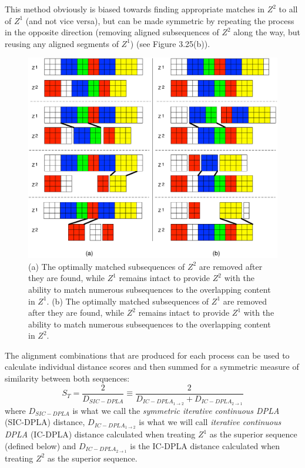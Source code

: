 \documentclass[12pt]{report} 	%
\numberwithin{figure}{chapter}
\numberwithin{table}{chapter}
\numberwithin{equation}{chapter}
\begin{document}
\begin{flushleft}
This method obviously is biased towards finding appropriate matches in $Z^2$ to all of $Z^1$ (and not vice versa), but can be made symmetric by repeating the process in the opposite direction (removing aligned subsequences of $Z^2$ along the way, but reusing any aligned segments of $Z^1$) (see Figure 3.25(b)). 
\begin{figure}[h!]
\begin{center}
\includegraphics[width=\linewidth]{GreedyMatching4}
\caption[Asymmetric greedy removal after matching in both directions]{(a) The optimally matched subsequences of $Z^2$ are removed after they are found, while $Z^1$ remains intact to provide $Z^2$ with the ability to match numerous subsequences to the overlapping content in $Z^1$. (b) The optimally matched subsequences of $Z^1$ are removed after they are found, while $Z^2$ remains intact to provide $Z^1$ with the ability to match numerous subsequences to the overlapping content in $Z^2$.}
\end{center}
\end{figure}
The alignment combinations that are produced for each process can be used to calculate individual distance scores and then summed for a symmetric measure of similarity between both sequences:
\begin{equation}
S_T = \frac{2}{D_{SIC-DPLA}} \equiv \frac{2}{D_{IC-DPLA_{1\to2}} + D_{IC-DPLA_{2\to1}}}
\end{equation}
where $D_{SIC-DPLA}$ is what we call the \textit{symmetric iterative continuous DPLA} (SIC-DPLA) distance, $D_{IC-DPLA_{1\to2}}$ is what we will call \textit{iterative continuous DPLA} (IC-DPLA) distance calculated when treating $Z^1$ as the superior sequence (defined below) and $D_{IC-DPLA_{2\to1}}$ is the IC-DPLA distance calculated when treating $Z^2$ as the superior sequence.


\end{flushleft}
\end{document}
